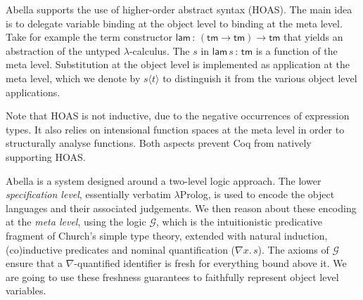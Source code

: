 \documentclass[a4paper,UKenglish]{lipics-v2016}
\newcommand{\ms}{\,}
\newcommand{\mrel}[1]{\mathrel{\ms #1 \ms}}
\newcommand{\OF}{\mrel{:}}
\newcommand{\lpApp}[2]{#1\langle#2\rangle}
\theoremstyle{plain}
\begin{document}
Abella supports the use of higher-order abstract syntax (HOAS).
The main idea is to delegate variable binding at the object level to binding at the meta level.
Take for example the term constructor $\mathsf{lam} \OF (\mathsf{tm} \to \mathsf{tm}) \to \mathsf{tm}$ that yields an abstraction of the untyped $\lambda$-calculus.
The $s$ in $\mathsf{lam}\,s \OF \mathsf{tm}$ is a function of the meta level.
Substitution at the object level is implemented as application at the meta level, which we denote by $\lpApp{s}{t}$ to distinguish it from the various object level applications.

Note that HOAS is not inductive, due to the negative occurrences of expression types.
It also relies on intensional function spaces at the meta level in order to structurally analyse functions.
Both aspects prevent Coq from natively supporting HOAS.

Abella is a system designed around a two-level logic approach.
The lower \emph{specification level}, essentially verbatim $\lambda$Prolog, is used to encode the object languages and their associated judgements.
We then reason about these encoding at the \emph{meta level}, using the logic $\mathcal{G}$, which is the intuitionistic predicative fragment of Church's simple type theory, extended with natural induction, (co)inductive predicates and nominal quantification ($\nabla x . \ms s$).
The axioms of $\mathcal{G}$ ensure that a $\nabla$-quantified identifier is fresh for everything bound above it.
We are going to use these freshness guarantees to faithfully represent object level variables.
\end{document}
